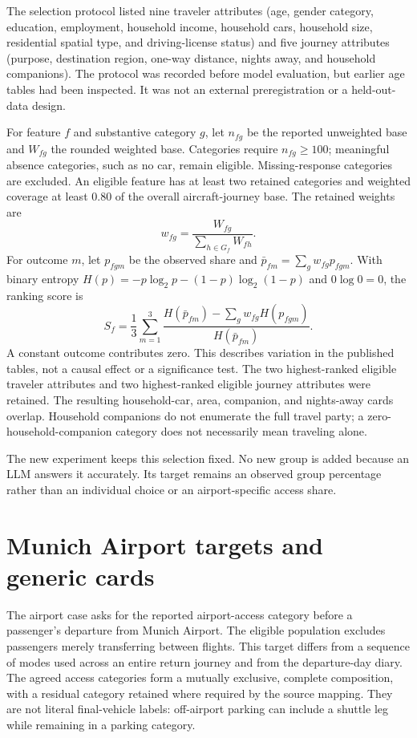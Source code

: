 \documentclass{article}
\begin{document}
The selection protocol listed nine traveler attributes (age, gender category, education, employment, household income, household cars, household size, residential spatial type, and driving-license status) and five journey attributes (purpose, destination region, one-way distance, nights away, and household companions). The protocol was recorded before model evaluation, but earlier age tables had been inspected. It was not an external preregistration or a held-out-data design.

For feature $f$ and substantive category $g$, let $n_{fg}$ be the reported unweighted base and $W_{fg}$ the rounded weighted base. Categories require $n_{fg}\geq100$; meaningful absence categories, such as no car, remain eligible. Missing-response categories are excluded. An eligible feature has at least two retained categories and weighted coverage at least 0.80 of the overall aircraft-journey base. The retained weights are
\begin{equation}
w_{fg}=\frac{W_{fg}}{\sum_{h\in G_f}W_{fh}}.
\end{equation}
For outcome $m$, let $p_{fgm}$ be the observed share and $\bar p_{fm}=\sum_g w_{fg}p_{fgm}$. With binary entropy $H(p)=-p\log_2p-(1-p)\log_2(1-p)$ and $0\log 0=0$, the ranking score is
\begin{equation}
S_f=\frac{1}{3}\sum_{m=1}^{3}
\frac{H(\bar p_{fm})-\sum_gw_{fg}H(p_{fgm})}{H(\bar p_{fm})}.
\end{equation}
A constant outcome contributes zero. This describes variation in the published tables, not a causal effect or a significance test. The two highest-ranked eligible traveler attributes and two highest-ranked eligible journey attributes were retained. The resulting household-car, area, companion, and nights-away cards overlap. Household companions do not enumerate the full travel party; a zero-household-companion category does not necessarily mean traveling alone.

The new experiment keeps this selection fixed. No new group is added because an LLM answers it accurately. Its target remains an observed group percentage rather than an individual choice or an airport-specific access share.

\section{Munich Airport targets and generic cards}
The airport case asks for the reported airport-access category before a passenger's departure from Munich Airport. The eligible population excludes passengers merely transferring between flights. This target differs from a sequence of modes used across an entire return journey and from the departure-day diary. The agreed access categories form a mutually exclusive, complete composition, with a residual category retained where required by the source mapping. They are not literal final-vehicle labels: off-airport parking can include a shuttle leg while remaining in a parking category.
\end{document}
